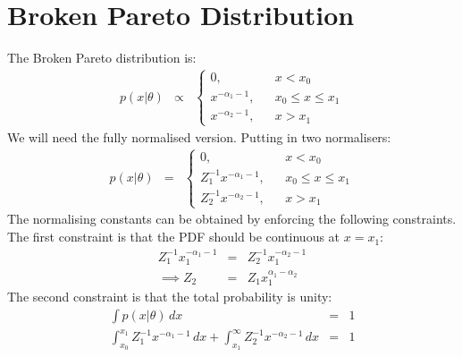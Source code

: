\documentclass[letterpaper, 11pt]{article}
\begin{document}
\section{Broken Pareto Distribution}
The Broken Pareto distribution is:
\begin{eqnarray}
p(x | \theta) &\propto&
\left\{
\begin{array}{lcr}
0, & & x < x_0 \\
x^{-\alpha_1 - 1}, & & x_0 \leq x \leq x_1 \\
x^{-\alpha_2 - 1}, & & x > x_1
\end{array}
\right.
\end{eqnarray}
We will need the fully normalised version. Putting in two normalisers:
\begin{eqnarray}
p(x | \theta) &=&
\left\{
\begin{array}{lcr}
0, & & x < x_0 \\
Z_1^{-1}x^{-\alpha_1 - 1}, & & x_0 \leq x \leq x_1 \\
Z_2^{-1}x^{-\alpha_2 - 1}, & & x > x_1
\end{array}
\right.
\end{eqnarray}
The normalising constants can be obtained by enforcing the following
constraints. The first constraint is that the PDF should be continuous at
$x=x_1$:
\begin{eqnarray}
Z_1^{-1} x_1^{-\alpha_1 - 1} &=& Z_2^{-1} x_1^{-\alpha_2 - 1} \\
\implies Z_2 &=& Z_1 x_1^{\alpha_1-\alpha_2}
\end{eqnarray}
The second constraint is that the total probability is unity:
\begin{eqnarray}
\int p(x|\theta) \, dx &=& 1 \\
\int_{x_0}^{x_1} Z_1^{-1}x^{-\alpha_1 - 1} \, dx
+ \int_{x_1}^\infty Z_2^{-1}x^{-\alpha_2 - 1}\, dx &=& 1 \\
\end{eqnarray}



\end{document}
